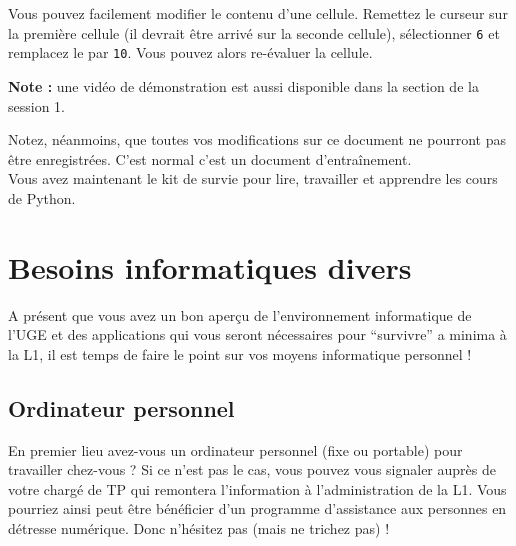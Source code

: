 \documentclass{article}
\begin{document}
\begin{exercice}
Vous pouvez facilement modifier le contenu d'une cellule. Remettez le curseur sur
    la première cellule (il devrait être arrivé sur la seconde cellule),   sélectionner \texttt{6} et
    remplacez le par \texttt{10}. Vous pouvez alors re-évaluer la cellule.

\textbf{Note :}  une vidéo de démonstration est aussi disponible dans la section de la session 1.

Notez, néanmoins, que toutes vos modifications sur ce document ne pourront pas être enregistrées. C'est normal c'est un document d'entraînement.\\
Vous avez maintenant le kit de survie pour lire, travailler et apprendre les cours de Python. 

\end{exercice}

\section{Besoins informatiques divers}

A présent que vous avez un bon aper\c cu de l'environnement informatique de l'UGE et des applications qui vous seront nécessaires pour ``survivre'' a minima à la L1, il est temps de faire le point sur vos moyens informatique personnel ! 

\subsection{Ordinateur personnel}

En premier lieu avez-vous un ordinateur personnel (fixe ou portable) pour travailler chez-vous ? Si ce n'est pas le cas, vous pouvez vous signaler auprès de votre chargé de TP qui remontera l'information à l'administration de la L1. Vous pourriez ainsi peut être bénéficier d'un programme d'assistance aux personnes en détresse numérique. Donc n'hésitez pas (mais ne trichez pas) !
\end{document}
